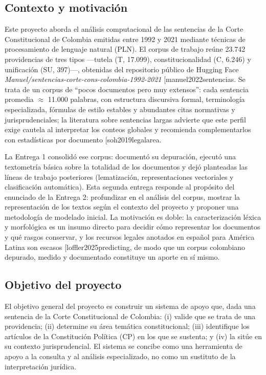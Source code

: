 \documentclass[11pt]{tg_usta}
\makeatletter
\renewcommand{\cite}{\@ifnextchar[{\@tempswatrue\@citex}{\@tempswafalse\@citex[]}}
\makeatother
\begin{document}
\subsection{Contexto y motivación}
Este proyecto aborda el análisis computacional de las sentencias de la Corte Constitucional de Colombia emitidas entre 1992 y 2021 mediante técnicas de procesamiento de lenguaje natural (PLN). El corpus de trabajo reúne 23.742 providencias de tres tipos ---tutela (T, 17.099), constitucionalidad (C, 6.246) y unificación (SU, 397)---, obtenidas del repositorio público de Hugging Face \emph{Manuel/sentencias-corte-cons-colombia-1992-2021} \cite{manuel2022sentencias}. Se trata de un corpus de ``pocos documentos pero muy extensos'': cada sentencia promedia $\approx$ 11.000 palabras, con estructura discursiva formal, terminología especializada, fórmulas de estilo estables y abundantes citas normativas y jurisprudenciales; la literatura sobre sentencias largas advierte que este perfil exige cautela al interpretar los conteos globales y recomienda complementarlos con estadísticas por documento \cite{soh2019legalarea}.

La Entrega 1 consolidó ese corpus: documentó su depuración, ejecutó una textometría básica sobre la totalidad de los documentos y dejó planteadas las líneas de trabajo posteriores (lematización, representaciones vectoriales y clasificación automática). Esta segunda entrega responde al propósito del enunciado de la Entrega 2: profundizar en el análisis del corpus, mostrar la representación de los textos según el contexto del proyecto y proponer una metodología de modelado inicial. La motivación es doble: la caracterización léxica y morfológica es un insumo directo para decidir cómo representar los documentos y qué rasgos conservar, y los recursos legales anotados en español para América Latina son escasos \cite{loffler2025predicting}, de modo que un corpus colombiano depurado, medido y documentado constituye un aporte en sí mismo.

\subsection{Objetivo del proyecto}
El objetivo general del proyecto es construir un sistema de apoyo que, dada una sentencia de la Corte Constitucional de Colombia: (i) valide que se trata de una providencia; (ii) determine su área temática constitucional; (iii) identifique los artículos de la Constitución Política (CP) en los que se sustenta; y (iv) la sitúe en su contexto jurisprudencial. El sistema se concibe como una herramienta de apoyo a la consulta y al análisis especializado, no como un sustituto de la interpretación jurídica.
\end{document}
